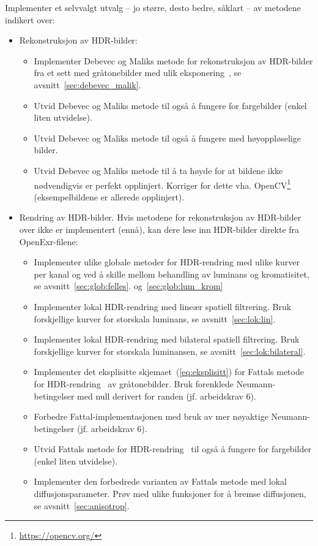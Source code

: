 \documentclass[11pt,a4paper]{article}
\begin{document}
Implementer et selvvalgt utvalg – jo større, desto bedre, såklart – av metodene indikert over:
\begin{itemize}[noitemsep]
\item Rekonstruksjon av HDR-bilder:
  \begin{itemize}
  \item Implementer Debevec og Maliks metode for rekonstruksjon av HDR-bilder fra et sett med gråtonebilder med ulik eksponering~\cite{Debevec:97}, se avsnitt~\ref{sec:debevec_malik}.
  \item Utvid Debevec og Maliks metode til også å fungere for fargebilder (enkel liten utvidelse).
  \item Utvid Debevec og Maliks metode til også å fungere med høyoppløselige bilder.
  \item Utvid Debevec og Maliks metode til å ta høyde for at bildene ikke nødvendigvis er perfekt opplinjert. Korriger for dette vha. OpenCV\footnote{\url{https://opencv.org/}} (eksempelbildene er allerede opplinjert).
  \end{itemize}
\item Rendring av HDR-bilder. Hvis metodene for rekonstruksjon av HDR-bilder over ikke er implementert (ennå), kan dere lese inn HDR-bilder direkte fra OpenExr-filene:
  \begin{itemize}
  \item Implementer ulike globale metoder for HDR-rendring med ulike kurver per kanal og ved å skille mellom behandling av luminans og kromatisitet, se avsnitt~\ref{sec:glob:felles}. og~\ref{sec:glob:lum_krom}
  \item Implementer lokal HDR-rendring med lineær spatiell filtrering. Bruk forskjellige kurver for storskala luminans, se avsnitt~\ref{sec:lok:lin}.
  \item Implementer lokal HDR-rendring med bilateral spatiell filtrering. Bruk forskjellige kurver for storskala luminansen, se avsnitt~\ref{sec:lok:bilateral}.
  \item Implementer det eksplisitte skjemaet~(\ref{eq:eksplisitt}) for Fattals metode for HDR-rend\-ring~\cite{Fattal:02} av gråtonebilder. Bruk forenklede Neumann-betingelser med null derivert for randen (jf. arbeidskrav 6).
  \item Forbedre Fattal-implementasjonen med bruk av mer nøyaktige Neumann-betingelser (jf. arbeidskrav 6).
  \item Utvid Fattals metode for HDR-rendring~\cite{Fattal:02} til også å fungere for fargebilder (enkel liten  utvidelse).
  \item Implementer den forbedrede varianten av Fattals metode med lokal diffusjonsparameter. Prøv med ulike funksjoner for å bremse diffusjonen, se avsnitt~\ref{sec:anisotrop}.

\end{itemize}
\end{itemize}
\end{document}
